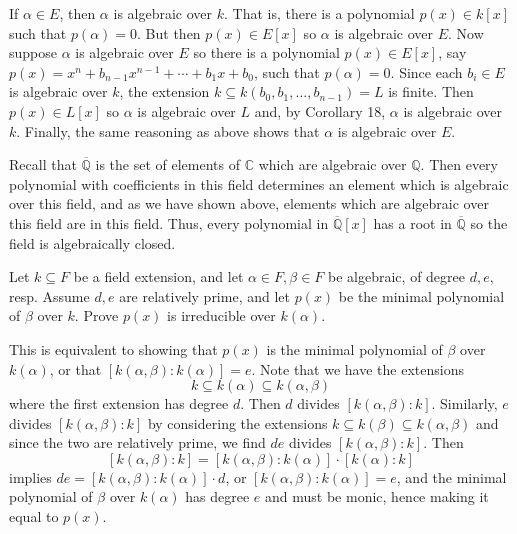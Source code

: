 \documentclass[../../master.tex]{subfiles}
\begin{document}
\begin{solution}
    If $\alpha \in E$, then $\alpha$ is algebraic over $k$.
    That is, there is a polynomial $p(x) \in k[x]$ such that $p(\alpha) = 0$.
    But then $p(x) \in E[x]$ so $\alpha$ is algebraic over $E$.
    Now suppose $\alpha$ is algebraic over $E$ so there is a polynomial $p(x) \in E[x]$, say $p(x) = x^{n} + b_{n-1}x^{n-1} + \cdots + b_1 x + b_0$, such that $p(\alpha) = 0$.
    Since each $b_i \in E$ is algebraic over $k$, the extension $k \subseteq k(b_0, b_1, \ldots, b_{n-1}) = L$ is finite.
    Then $p(x) \in L[x]$ so $\alpha$ is algebraic over $L$ and, by Corollary 18, $\alpha$ is algebraic over $k$.
    Finally, the same reasoning as above shows that $\alpha$ is algebraic over $E$.

    Recall that $\overline{\mathbb{Q}}$ is the set of elements of $\mathbb{C}$ which are algebraic over $\mathbb{Q}$.
    Then every polynomial with coefficients in this field determines an element which is algebraic over this field, and as we have shown above, elements which are algebraic over this field are in this field.
    Thus, every polynomial in $\overline{\mathbb{Q}}[x]$ has a root in $\overline{\mathbb{Q}}$ so the field is algebraically closed.
\end{solution}

\begin{problem}
    Let $k \subseteq F$ be a field extension, and let $\alpha \in F, \beta \in F$ be algebraic, of degree $d, e$, resp.
    Assume $d, e$ are relatively prime, and let $p(x)$ be the minimal polynomial of $\beta$ over $k$.
    Prove $p(x)$ is irreducible over $k(\alpha)$.
\end{problem}

\begin{solution}
    This is equivalent to showing that $p(x)$ is the minimal polynomial of $\beta$ over $k(\alpha)$, or that $[k(\alpha, \beta) : k(\alpha)] = e$.
    Note that we have the extensions
    \[
        k \subseteq k(\alpha) \subseteq k(\alpha, \beta)
    \]
    where the first extension has degree $d$.
    Then $d$ divides $[k(\alpha, \beta) : k]$.
    Similarly, $e$ divides $[k(\alpha, \beta) : k]$ by considering the extensions $k \subseteq k(\beta) \subseteq k(\alpha, \beta)$ and since the two are relatively prime, we find $de$ divides $[k(\alpha, \beta) : k]$.
    Then
    \[
        [k(\alpha, \beta) : k] = [k(\alpha, \beta) : k(\alpha)] \cdot [k(\alpha) : k] 
    \]
    implies $de = [k(\alpha, \beta) : k(\alpha)] \cdot d$, or $[k(\alpha, \beta) : k(\alpha)] = e$, and the minimal polynomial of $\beta$ over $k(\alpha)$ has degree $e$ and must be monic, hence making it equal to $p(x)$.
\end{solution}
\end{document}
